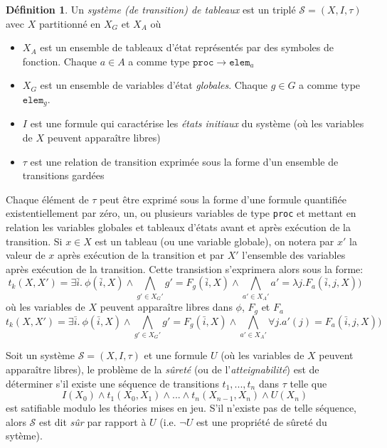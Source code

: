 \documentclass[a4paper, twoside]{scrartcl}
\theoremstyle{plain}%
\theoremstyle{definition}
\newtheorem{defn}{Définition}[section]
\theoremstyle{remark}
\begin{document}
\begin{defn}
  Un \emph{système (de transition) de tableaux} est un triplé
  $\mathcal{S} = (X, I, \tau)$ avec $X$ partitionné en $X_G$ et $X_A$ où
  \begin{itemize}
  \item $X_A$ est un ensemble de tableaux d'état représentés par des
    symboles de fonction. Chaque $a \in A$ a comme type
    $\mathtt{proc} \to \mathtt{elem}_a$
  \item $X_G$ est un ensemble de variables d'état
    \emph{globales}. Chaque $g \in G$ a comme type
    $\mathtt{elem}_g$.
  \item $I$ est une formule qui caractérise les \emph{états initiaux}
    du système (où les variables de $X$ peuvent apparaître libres)
  \item $\tau$ est une relation de transition exprimée sous la forme
    d'un ensemble de transitions gardées
  \end{itemize}

  Chaque élément de $\tau$ peut être exprimé sous la forme d'une
  formule quantifiée existentiellement par zéro, un, ou plusieurs
  variables de type \texttt{proc} et mettant en relation les variables
  globales et tableaux d'états avant et après exécution de la
  transition. Si $x \in X$ est un tableau (ou une variable globale),
  on notera par $x'$ la valeur de $x$ après exécution de la
  transition et par $X'$ l'ensemble des variables après exécution de
  la transition. Cette transistion s'exprimera alors sous la forme:
  \[ t_k(X,X') = \exists \bar{i}.~\phi(\bar{i}, X) \wedge 
  \bigwedge_{g' \in X_G'} g' = F_g(\bar{i},X) \wedge
  \bigwedge_{a' \in X_A'} a' = \lambda j. F_a(\bar{i},j,X))
  \]
  où les variables de $X$ peuvent apparaître libres dans $\phi$, $F_g$
  et $F_a$ 
  \[ t_k(X,X') = \exists \bar{i}.~\phi(\bar{i}, X) \wedge 
  \bigwedge_{g' \in X_G'} g' = F_g(\bar{i},X) \wedge
  \bigwedge_{a' \in X_A'} \forall j. a'(j) = F_a(\bar{i},j,X))
  \]
\end{defn}


Soit un système $\mathcal{S} = (X, I, \tau)$ et une formule $U$ (où
les variables de $X$ peuvent apparaître libres), le problème de
la \emph{sûreté} (ou de l'\emph{atteignabilité}) est de déterminer s'il
existe une séquence de transitions $t_1, ..., t_n$ dans $\tau$ telle
que
  \[ I(X_0) \wedge t_1(X_0,X_1)  \wedge ...  \wedge 
  t_n(X_{n-1},X_n) \wedge U(X_n)
  \]
est satifiable modulo les théories mises en jeu. S'il n'existe pas de
telle séquence, alors $\mathcal{S}$ est dit \emph{sûr} par rapport à
$U$ (i.e. $\neg U$ est une propriété de sûreté du sytème).
\end{document}
